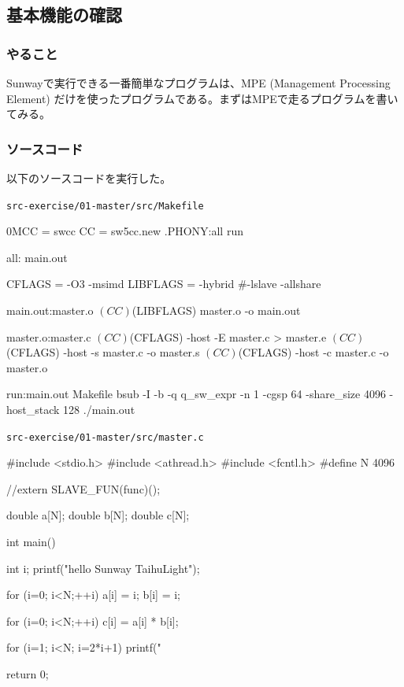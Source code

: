 \subsection{基本機能の確認}
\subsubsection{やること}

Sunwayで実行できる一番簡単なプログラムは、MPE
(Management Processing Element)
だけを使ったプログラムである。まずはMPEで走るプログラムを書いてみる。


\subsubsection{ソースコード}
以下のソースコードを実行した。

\verb`src-exercise/01-master/src/Makefile`
\begin{code}
0MCC = swcc
CC = sw5cc.new
.PHONY:all run

all: main.out

CFLAGS = -O3 -msimd
LIBFLAGS = -hybrid #-lslave -allshare

main.out:master.o
	$(CC) $(LIBFLAGS) master.o -o main.out

master.o:master.c
	$(CC) $(CFLAGS) -host -E master.c > master.e
	$(CC) $(CFLAGS) -host -s master.c -o master.s
	$(CC) $(CFLAGS) -host -c master.c -o master.o

run:main.out Makefile
	bsub -I -b -q q_sw_expr -n 1 -cgsp 64 -share_size 4096 -host_stack 128 ./main.out

\end{code}

\verb`src-exercise/01-master/src/master.c`
\begin{code}
#include <stdio.h>
#include <athread.h>
#include <fcntl.h>
#define N 4096


//extern SLAVE_FUN(func)();

double a[N];
double b[N];
double c[N];

int main() {
  int i;
  printf("hello Sunway TaihuLight\n");

  for (i=0; i<N;++i){
    a[i] = i;
    b[i] = i;
  }

  for (i=0; i<N;++i){
    c[i] = a[i] * b[i];
  }

  for (i=1; i<N; i=2*i+1){
    printf("%
  }

  return 0;
}

\end{code}

